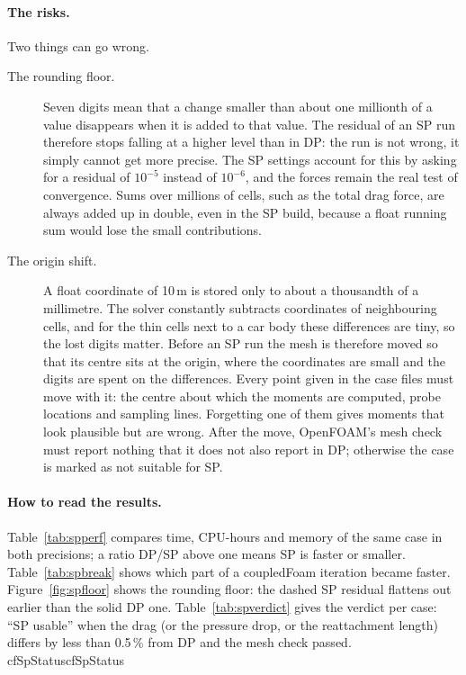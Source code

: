 \documentclass[11pt,a4paper]{article}
\newcommand{\cfpendingmark}{\fbox{\scriptsize pending}}
\newcommand{\cfnum}[1]{%
  \ifcsname cf#1\endcsname\csname cf#1\endcsname\else\cfpendingmark\fi}
\begin{document}
\paragraph{The risks.} Two things can go wrong.
\begin{description}
\item[The rounding floor.] Seven digits mean that a change smaller than
  about one millionth of a value disappears when it is added to that value.
  The residual of an SP run therefore stops falling at a higher level than
  in DP: the run is not wrong, it simply cannot get more precise. The SP
  settings account for this by asking for a residual of $10^{-5}$ instead of
  $10^{-6}$, and the forces remain the real test of convergence.
  Sums over millions of cells, such as the total drag force, are always
  added up in double, even in the SP build, because a float running sum
  would lose the small contributions.
\item[The origin shift.] A float coordinate of 10\,m is stored only to about
  a thousandth of a millimetre. The solver constantly subtracts coordinates
  of neighbouring cells, and for the thin cells next to a car body these
  differences are tiny, so the lost digits matter. Before an SP run the
  mesh is therefore moved so that its centre sits at the origin, where the
  coordinates are small and the digits are spent on the differences. Every
  point given in the case files must move with it: the centre about which
  the moments are computed, probe locations and sampling lines. Forgetting
  one of them gives moments that look plausible but are wrong. After the
  move, OpenFOAM's mesh check must report nothing that it does not also
  report in DP; otherwise the case is marked as not suitable for SP.
\end{description}

\paragraph{How to read the results.} Table~\ref{tab:spperf} compares time,
CPU-hours and memory of the same case in both precisions; a ratio DP/SP
above one means SP is faster or smaller. Table~\ref{tab:spbreak} shows
which part of a coupledFoam iteration became faster.
Figure~\ref{fig:spfloor} shows the rounding floor: the dashed SP residual
flattens out earlier than the solid DP one. Table~\ref{tab:spverdict} gives
the verdict per case: ``SP usable'' when the drag (or the pressure drop,
or the reattachment length) differs by less than 0.5\,\% from DP and the
mesh check passed. \cfnum{SpStatus}
\end{document}
